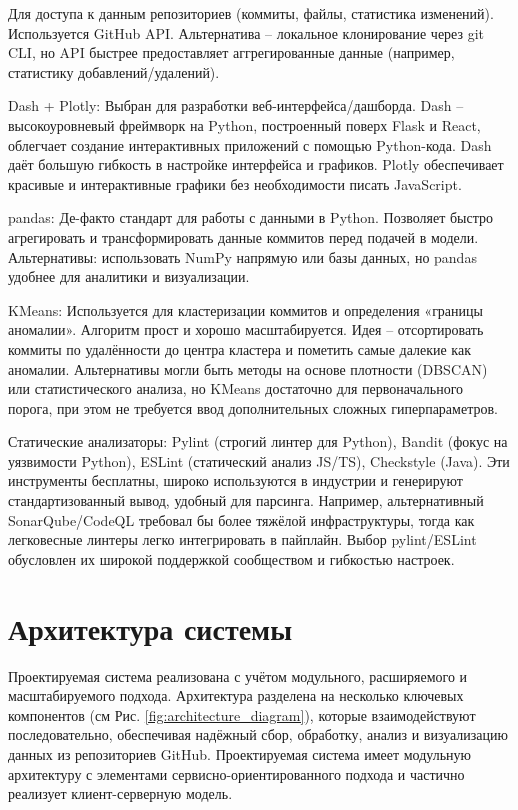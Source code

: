 Для доступа к данным репозиториев (коммиты, файлы, статистика изменений). Используется GitHub API. Альтернатива – локальное клонирование через git CLI, но API быстрее предоставляет аггрегированные данные (например, статистику добавлений/удалений).

Dash + Plotly: Выбран для разработки веб-интерфейса/дашборда. Dash – высокоуровневый фреймворк на Python, построенный поверх Flask и React, облегчает создание интерактивных приложений с помощью Python-кода. Dash даёт большую гибкость в настройке интерфейса и графиков. Plotly обеспечивает красивые и интерактивные графики без необходимости писать JavaScript.

pandas: Де-факто стандарт для работы с данными в Python. Позволяет быстро агрегировать и трансформировать данные коммитов перед подачей в модели. Альтернативы: использовать NumPy напрямую или базы данных, но pandas удобнее для аналитики и визуализации.

KMeans: Используется для кластеризации коммитов и определения «границы аномалии». Алгоритм прост и хорошо масштабируется. Идея – отсортировать коммиты по удалённости до центра кластера и пометить самые далекие как аномалии. Альтернативы могли быть методы на основе плотности (DBSCAN) или статистического анализа, но KMeans достаточно для первоначального порога, при этом не требуется ввод дополнительных сложных гиперпараметров.

Статические анализаторы: Pylint (строгий линтер для Python), Bandit (фокус на уязвимости Python), ESLint (статический анализ JS/TS), Checkstyle (Java). Эти инструменты бесплатны, широко используются в индустрии и генерируют стандартизованный вывод, удобный для парсинга. Например, альтернативный SonarQube/CodeQL требовал бы более тяжёлой инфраструктуры, тогда как легковесные линтеры легко интегрировать в пайплайн. Выбор pylint/ESLint обусловлен их широкой поддержкой сообществом и гибкостью настроек.

\section{Архитектура системы} \label{ch2:2.4}

Проектируемая система реализована с учётом модульного, расширяемого и масштабируемого подхода. Архитектура разделена на несколько ключевых компонентов (см Рис. \ref{fig:architecture_diagram}), которые взаимодействуют последовательно, обеспечивая надёжный сбор, обработку, анализ и визуализацию данных из репозиториев GitHub. Проектируемая система имеет модульную архитектуру с элементами сервисно-ориентированного подхода и частично реализует клиент-серверную модель.

